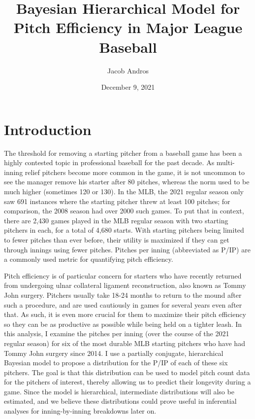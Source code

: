 \documentclass{article}
\title{\vspace{-2cm} Bayesian Hierarchical Model for Pitch Efficiency in Major League Baseball}
\author{Jacob Andros}
\date{December 9, 2021}
\begin{document}
\maketitle

\section{Introduction}

The threshold for removing a starting pitcher from a baseball game has been a highly contested topic in professional baseball for the past decade. As multi-inning relief pitchers become more common in the game, it is not uncommon to see the manager remove his starter after 80 pitches, whereas the norm used to be much higher (sometimes 120 or 130). In the MLB, the 2021 regular season only saw 691 instances where the starting pitcher threw at least 100 pitches; for comparison, the 2008 season had over 2000 such games. To put that in context, there are 2,430 games played in the MLB regular season with two starting pitchers in each, for a total of 4,680 starts. With starting pitchers being limited to fewer pitches than ever before, their utility is maximized if they can get through innings using fewer pitches. Pitches per inning (abbreviated as P/IP) are a commonly used metric for quantifying pitch efficiency. 

Pitch efficiency is of particular concern for starters who have recently returned from undergoing ulnar collateral ligament reconstruction, also known as Tommy John surgery. Pitchers usually take 18-24 months to return to the mound after such a procedure, and are used cautiously in games for several years even after that. As such, it is even more crucial for them to maximize their pitch efficiency so they can be as productive as possible while being held on a tighter leash. In this analysis, I examine the pitches per inning (over the course of the 2021 regular season) for six of the most durable MLB starting pitchers who have had Tommy John surgery since 2014. I use a partially conjugate, hierarchical Bayesian model to propose a distribution for the P/IP of each of these six pitchers. The goal is that this distribution can be used to model pitch count data for the pitchers of interest, thereby allowing us to predict their longevity during a game. Since the model is hierarchical, intermediate distributions will also be estimated, and we believe these distributions could prove useful in inferential analyses for inning-by-inning breakdowns later on.
\end{document}
